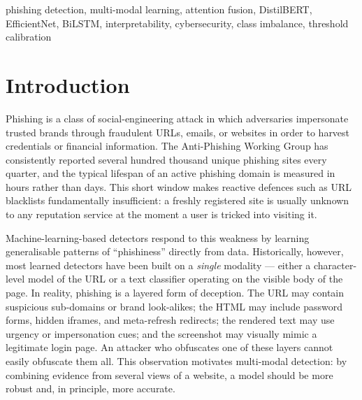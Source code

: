 \documentclass[conference]{IEEEtran}
\begin{document}
\begin{abstract}
modality importance by composite-score drop: URL ($-0.103$) is by far
the most important, followed by HTML ($-0.015$) and text ($-0.003$),
while disabling visual actually \emph{improves} composite score
($+0.017$), showing that the frozen EfficientNet-B0 branch adds more
noise than signal on this corpus.  A score-level SHAP analysis
($R^{2}=0.955$ surrogate fidelity) and a modality-level Shapley
analysis on the projected fusion vectors corroborate the ablation:
URL is the dominant contributor, followed by visual, text, and HTML.
Beyond raw accuracy we perform an exploratory data study, a
temperature-calibration analysis, a threshold sweep, and an
embedding $t$-SNE visualisation. The results reveal that a
carefully balanced fusion architecture (matched classifier capacity
across branches, a large-enough projection dimension to avoid an
information bottleneck, and a composite-score-driven hyperparameter
search) beats the strongest unimodal baseline on every headline
metric, motivating future work on larger corpora, adversarial
robustness, and fine-tuned encoders.
\end{abstract}

\begin{IEEEkeywords}
phishing detection, multi-modal learning, attention fusion,
DistilBERT, EfficientNet, BiLSTM, interpretability, cybersecurity,
class imbalance, threshold calibration
\end{IEEEkeywords}

\section{Introduction}
Phishing is a class of social-engineering attack in which adversaries
impersonate trusted brands through fraudulent URLs, emails, or
websites in order to harvest credentials or financial information.
The Anti-Phishing Working Group has consistently reported several
hundred thousand unique phishing sites every quarter, and the typical
lifespan of an active phishing domain is measured in hours rather
than days. This short window makes reactive defences such as URL
blacklists fundamentally insufficient: a freshly registered site is
usually unknown to any reputation service at the moment a user is
tricked into visiting it.

Machine-learning-based detectors respond to this weakness by
learning generalisable patterns of ``phishiness'' directly from data.
Historically, however, most learned detectors have been built on a
\emph{single} modality --- either a character-level model of the URL
or a text classifier operating on the visible body of the page.
In reality, phishing is a layered form of deception. The URL may
contain suspicious sub-domains or brand look-alikes; the HTML may
include password forms, hidden iframes, and meta-refresh redirects;
the rendered text may use urgency or impersonation cues; and the
screenshot may visually mimic a legitimate login page. An attacker
who obfuscates one of these layers cannot easily obfuscate them all.
This observation motivates multi-modal detection: by combining
evidence from several views of a website, a model should be more
robust and, in principle, more accurate.
\end{document}
